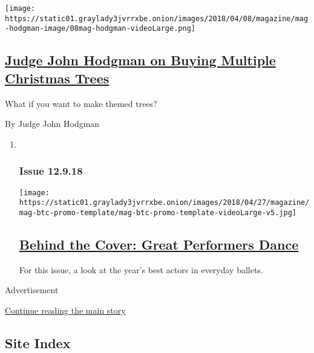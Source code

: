 \begin{enumerate}
  \texttt{[image: https://static01.graylady3jvrrxbe.onion/images/2018/04/08/magazine/mag-hodgman-image/08mag-hodgman-videoLarge.png]}

  \hypertarget{judge-john-hodgman-on-buying-multiple-christmas-trees}{%
  \subsection{\texorpdfstring{\href{/2018/12/07/magazine/judge-john-hodgman-on-buying-multiple-christmas-trees.html}{Judge
  John Hodgman on Buying Multiple Christmas
  Trees}}{Judge John Hodgman on Buying Multiple Christmas Trees}}\label{judge-john-hodgman-on-buying-multiple-christmas-trees}}

  What if you want to make themed trees?

  By Judge John Hodgman
\end{enumerate}

\begin{enumerate}
\def\labelenumi{\arabic{enumi}.}
\item ~
  \hypertarget{issue-12918}{%
  \subsubsection{Issue 12.9.18}\label{issue-12918}}

  \texttt{[image: https://static01.graylady3jvrrxbe.onion/images/2018/04/27/magazine/mag-btc-promo-template/mag-btc-promo-template-videoLarge-v5.jpg]}

  \hypertarget{behind-the-cover-great-performers-dance}{%
  \subsection{\texorpdfstring{\href{/2018/12/07/magazine/behind-the-cover-great-performers-dance.html}{Behind
  the Cover: Great Performers
  Dance}}{Behind the Cover: Great Performers Dance}}\label{behind-the-cover-great-performers-dance}}

  For this issue, a look at the year's best actors in everyday ballets.
\end{enumerate}

Advertisement

\protect\hyperlink{after-mid1}{Continue reading the main story}

\hypertarget{site-index}{%
\subsection{Site Index}\label{site-index}}

